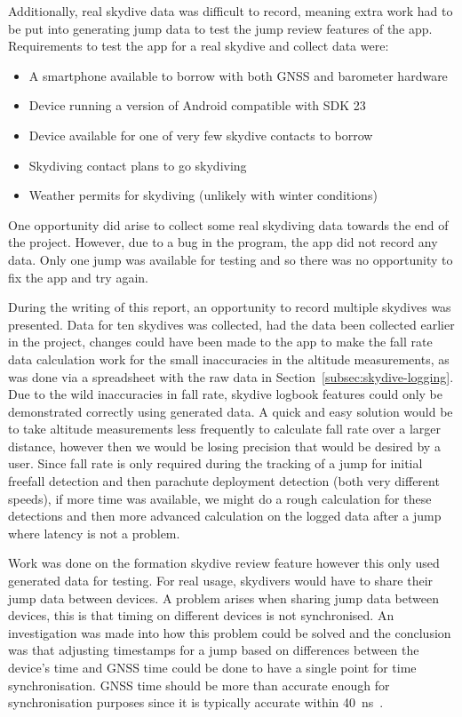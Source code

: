 Additionally, real skydive data was difficult to record, meaning extra work had to be put into generating jump data to test the jump review features of the app. Requirements to test the app for a real skydive and collect data were:
\begin{itemize}
  \item A smartphone available to borrow with both GNSS and barometer hardware
  \item Device running a version of Android compatible with SDK 23
  \item Device available for one of very few skydive contacts to borrow
  \item Skydiving contact plans to go skydiving
  \item Weather permits for skydiving (unlikely with winter conditions)
\end{itemize}
One opportunity did arise to collect some real skydiving data towards the end of the project. However, due to a bug in the program, the app did not record any data. Only one jump was available for testing and so there was no opportunity to fix the app and try again.

During the writing of this report, an opportunity to record multiple skydives was presented. Data for ten skydives was collected, had the data been collected earlier in the project, changes could have been made to the app to make the fall rate data calculation work for the small inaccuracies in the altitude measurements, as was done via a spreadsheet with the raw data in Section~\ref{subsec:skydive-logging}. Due to the wild inaccuracies in fall rate, skydive logbook features could only be demonstrated correctly using generated data. A quick and easy solution would be to take altitude measurements less frequently to calculate fall rate over a larger distance, however then we would be losing precision that would be desired by a user.
Since fall rate is only required during the tracking of a jump for initial freefall detection and then parachute deployment detection (both very different speeds), if more time was available, we might do a rough calculation for these detections and then more advanced calculation on the logged data after a jump where latency is not a problem.

Work was done on the formation skydive review feature however this only used generated data for testing. For real usage, skydivers would have to share their jump data between devices. A problem arises when sharing jump data between devices, this is that timing on different devices is not synchronised. An investigation was made into how this problem could be solved and the conclusion was that adjusting timestamps for a jump based on differences between the device's time and GNSS time could be done to have a single point for time synchronisation. GNSS time should be more than accurate enough for synchronisation purposes since it is typically accurate within \SI{40}{\nano\second}~\cite{_gps_????}.

